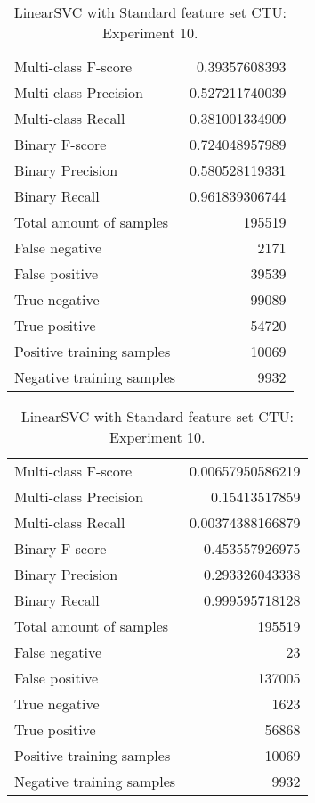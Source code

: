 \begin{table}[H]
\begin{minipage}{0.5\textwidth}
\caption{LinearSVC with Standard feature set CTU: Experiment 9.}
\centering
\begin{tabular}{l r}
\toprule
Multi-class F-score & 0.39357608393 \\
Multi-class Precision & 0.527211740039 \\
Multi-class Recall & 0.381001334909 \\
\midrule
Binary F-score & 0.724048957989 \\
Binary Precision & 0.580528119331 \\
Binary Recall & 0.961839306744 \\
\midrule
Total amount of samples & 195519 \\
False negative & 2171 \\
False positive & 39539 \\
True negative & 99089 \\
True positive & 54720 \\
\midrule
Positive training samples & 10069 \\
Negative training samples & 9932 \\
\bottomrule
\end{tabular}
\end{minipage}
\hfillx
\begin{minipage}{0.5\textwidth}
\caption{LinearSVC with Standard feature set CTU: Experiment 10.}
\centering
\begin{tabular}{l r}
\toprule
Multi-class F-score & 0.00657950586219 \\
Multi-class Precision & 0.15413517859 \\
Multi-class Recall & 0.00374388166879 \\
\midrule
Binary F-score & 0.453557926975 \\
Binary Precision & 0.293326043338 \\
Binary Recall & 0.999595718128 \\
\midrule
Total amount of samples & 195519 \\
False negative & 23 \\
False positive & 137005 \\
True negative & 1623 \\
True positive & 56868 \\
\midrule
Positive training samples & 10069 \\
Negative training samples & 9932 \\
\bottomrule
\end{tabular}
\end{minipage}
\end{table}
